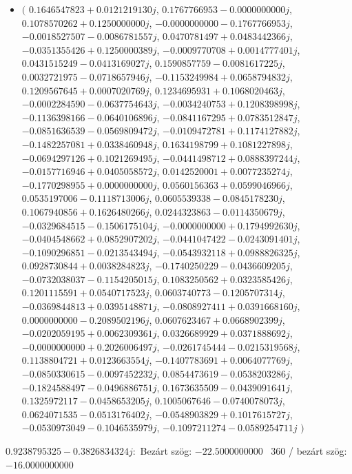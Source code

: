 \documentclass[14pt,a4paper]{article}
\begin{document}
\begin{itemize}
\item
$\big($
$0.1646547823+0.0121219130j$, $0.1767766953-0.0000000000j$, $0.1078570262+0.1250000000j$, $-0.0000000000-0.1767766953j$, $-0.0018527507-0.0086781557j$, $0.0470781497+0.0483442366j$, $-0.0351355426+0.1250000389j$, $-0.0009770708+0.0014777401j$, $0.0431515249-0.0413169027j$, $0.1590857759-0.0081617225j$, $0.0032721975-0.0718657946j$, $-0.1153249984+0.0658794832j$, $0.1209567645+0.0007020769j$, $0.1234695931+0.1068020463j$, $-0.0002284590-0.0637754643j$, $-0.0034240753+0.1208398998j$, $-0.1136398166-0.0640106896j$, $-0.0841167295+0.0783512847j$, $-0.0851636539-0.0569809472j$, $-0.0109472781+0.1174127882j$, $-0.1482257081+0.0338460948j$, $0.1634198799+0.1081227898j$, $-0.0694297126+0.1021269495j$, $-0.0441498712+0.0888397244j$, $-0.0157716946+0.0405058572j$, $0.0142520001+0.0077235274j$, $-0.1770298955+0.0000000000j$, $0.0560156363+0.0599046966j$, $0.0535197006-0.1118713006j$, $0.0605539338-0.0845178230j$, $0.1067940856+0.1626480266j$, $0.0244323863-0.0114350679j$, $-0.0329684515-0.1506175104j$, $-0.0000000000+0.1794992630j$, $-0.0404548662+0.0852907202j$, $-0.0441047422-0.0243091401j$, $-0.1090296851-0.0213543494j$, $-0.0543932118+0.0988826325j$, $0.0928730844+0.0038284823j$, $-0.1740250229-0.0436609205j$, $-0.0732038037-0.1154205015j$, $0.1083250562+0.0323585426j$, $0.1201115591+0.0540717523j$, $0.0603740773-0.1205707314j$, $-0.0369844813+0.0395148871j$, $-0.0808927411+0.0391668160j$, $0.0000000000-0.2089502196j$, $0.0607623467+0.0668902399j$, $-0.0202059195+0.0062309361j$, $0.0326689929+0.0371888692j$, $-0.0000000000+0.2026006497j$, $-0.0261745444-0.0215319568j$, $0.1138804721+0.0123663554j$, $-0.1407783691+0.0064077769j$, $-0.0850330615-0.0097452232j$, $0.0854473619-0.0538203286j$, $-0.1824588497-0.0496886751j$, $0.1673635509-0.0439091641j$, $0.1325972117-0.0458653205j$, $0.1005067646-0.0740078073j$, $0.0624071535-0.0513176402j$, $-0.0548903829+0.1017615727j$, $-0.0530973049-0.1046535979j$, $-0.1097211274-0.0589254711j$
$\big)$
\end{itemize}
$0.9238795325-0.3826834324j$:\
Bezárt szög: $-22.5000000000$ \
360 / bezárt szög: $-16.0000000000$\
\end{document}
